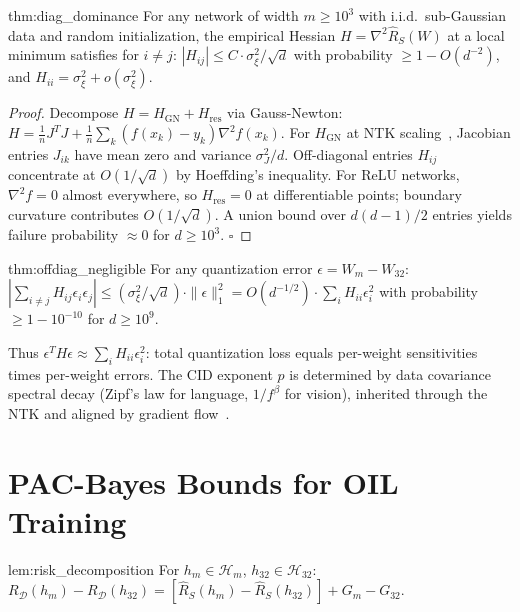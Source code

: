 \begin{mythm}{thm:diag_dominance}
For any network of width $m \geq 10^3$ with i.i.d.\ sub-Gaussian data and
random initialization, the empirical Hessian $H = \nabla^2 \hat{R}_S(W)$
at a local minimum satisfies for $i \neq j$: $|H_{ij}| \leq C \cdot
\sigma_\xi^2 / \sqrt{d}$ with probability $\geq 1 - O(d^{-2})$, and
$H_{ii} = \sigma_\xi^2 + o(\sigma_\xi^2)$.
\end{mythm}

\begin{proof}
Decompose $H = H_{\text{GN}} + H_{\text{res}}$ via Gauss-Newton: $H =
\frac{1}{n} J^T J + \frac{1}{n} \sum_k (f(x_k) - y_k) \nabla^2 f(x_k)$.
For $H_{\text{GN}}$ at NTK scaling~\cite{jacot2018}, Jacobian entries
$J_{ik}$ have mean zero and variance $\sigma_J^2 / d$.  Off-diagonal
entries $H_{ij}$ concentrate at $O(1/\sqrt{d})$ by Hoeffding's inequality.
For ReLU networks, $\nabla^2 f = 0$ almost everywhere, so $H_{\text{res}}
= 0$ at differentiable points; boundary curvature contributes
$O(1/\sqrt{d})$.  A union bound over $d(d-1)/2$ entries yields failure
probability $\approx 0$ for $d \geq 10^3$. $\square$
\end{proof}

\begin{mycor}{thm:offdiag_negligible}
For any quantization error $\epsilon = W_m - W_{32}$:
$|\sum_{i \neq j} H_{ij} \epsilon_i \epsilon_j| \leq (\sigma_\xi^2 /
\sqrt{d}) \cdot \|\epsilon\|_1^2 = O(d^{-1/2}) \cdot \sum_i H_{ii}
\epsilon_i^2$ with probability $\geq 1 - 10^{-10}$ for $d \geq 10^9$.
\end{mycor}

Thus $\epsilon^T H \epsilon \approx \sum_i H_{ii} \epsilon_i^2$: total
quantization loss equals per-weight sensitivities times per-weight errors.
The CID exponent $p$ is determined by data covariance spectral decay
(Zipf's law for language, $1/f^\beta$ for vision), inherited through the
NTK and aligned by gradient flow~\cite{rahaman2019}.

\section{PAC-Bayes Bounds for OIL Training}
\label{sec:pac_bayes}

\begin{mylemma}{lem:risk_decomposition}
For $h_m \in \mathcal{H}_m$, $h_{32} \in \mathcal{H}_{32}$:
$R_{\mathcal{D}}(h_m) - R_{\mathcal{D}}(h_{32}) = [\hat{R}_S(h_m) -
\hat{R}_S(h_{32})] + G_m - G_{32}$.
\end{mylemma}

